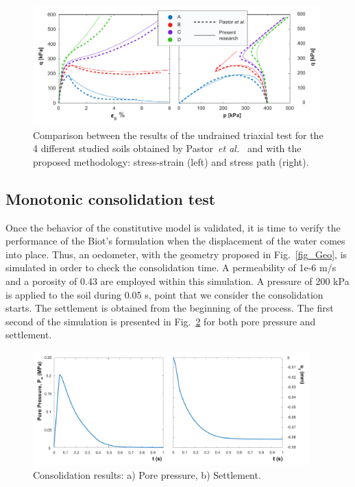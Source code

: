 \documentclass[preprint,12pt,a4paper]{elsarticle}
\begin{document}
\begin{figure}
\centering
\includegraphics[width=0.99\textwidth]{Figs/undrained.pdf}
\caption{Comparison between the results of the undrained triaxial test for the 4 different studied soils obtained by Pastor~\textit{et al.}~\cite{PastorZC:90} and with the proposed methodology: stress-strain (left) and stress path (right).}
\label{fig_undrained}
\end{figure}


\subsection{Monotonic consolidation test}
\label{sec:32}
Once the behavior of the constitutive model is validated, it is time to verify the performance of the Biot's formulation when the displacement of the water comes into place. Thus, an oedometer, with the geometry proposed in Fig.~\ref{fig_Geo}, is simulated in order to check the consolidation time. A permeability of 1e-6 m/s and a porosity of 0.43 are employed within this simulation. A pressure of 200 kPa is applied to the soil during 0.05 s, point that we consider the consolidation starts. The settlement is obtained from the beginning of the process. The first second of the simulation is presented in Fig.~\ref{fig_conso} for both pore pressure and settlement.
\begin{figure}
\centering
\includegraphics[width=0.95\textwidth]{Figs/conso.pdf}
\caption{Consolidation results: a) Pore pressure, b) Settlement.}
\label{fig_conso}
\end{figure}
\end{document}
